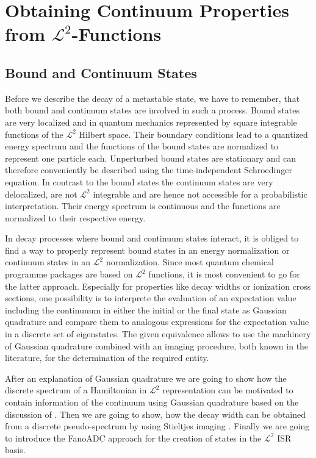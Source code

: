 \chapter{Obtaining Continuum Properties from $\mathcal{L}^2$-Functions}


\section{Bound and Continuum States}
Before we describe the decay of a metastable state, we have to remember,
that both bound and continuum states are involved in such a process.
Bound states are very localized and in quantum mechanics
represented by square integrable
functions of the $\mathcal{L}^2$ Hilbert space. Their boundary conditions
lead to a quantized energy spectrum and the functions of the bound states
are normalized
to represent one particle each. Unperturbed bound states are stationary
and can therefore conveniently be described using the time-independent
Schroedinger equation.
In contrast to the bound states the
continuum states are very delocalized, are not $\mathcal{L}^2$
integrable and are hence not accessible for a probabilistic interpretation.
Their energy spectrum is continuous and the functions are normalized to
their respective energy.

In decay processes
where bound and continuum states interact, it is obliged to find a way to
properly represent bound states in an energy normalization or continuum states
in an $\mathcal{L}^2$ normalization.
Since most quantum chemical programme packages are based
on $\mathcal{L}^2$ functions,
it is most convenient to go for the latter approach.
Especially for properties like decay widths or ionization cross sections, one
possibility is to interprete the evaluation of an expectation value
including the continuuum in either the initial or the final state as
Gaussian quadrature and compare them to analogous expressions for the
expectation value in a discrete set of eigenstates. The given equivalence
allows to use the machinery of Gaussian quadrature combined with an imaging
procedure, both known in the literature,
for the determination of the required entity. \cite{Reinhardt79}

After an explanation of Gaussian quadrature we are going to show how
the discrete spectrum of a Hamiltonian in $\mathcal{L}^2$ representation
can be motivated to contain information of the continuum using Gaussian quadrature
based on the discussion of \cite{Reinhardt79}.
Then we are going to show, how the decay width can be obtained from a
discrete pseudo-spectrum by using Stieltjes imaging \cite{Langhoff76,Corcoran77}.
Finally we are going to introduce the FanoADC approach for the creation of
states in the $\mathcal{L}^2$ \ac{ISR} basis.



